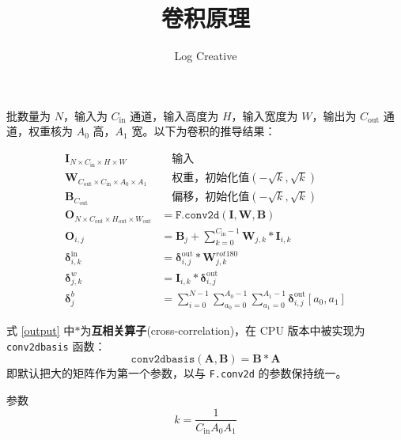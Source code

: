 \documentclass{ctexart}
\begin{document}
    \title{卷积原理}
    \author{Log Creative}
    \date{}
    \maketitle

    批数量为 $N$，输入为 $C_\text{in}$ 通道，输入高度为 $H$，输入宽度为 $W$，输出为 $C_\text{out}$ 通道，权重核为 $A_0$ 高，$A_1$ 宽。以下为卷积的推导结果\cite{gate}：

    \begin{align}
        \mathbf{I}_{N\times C_\text{in}\times H\times W}&\quad\text{输入}\nonumber\\
        \mathbf{W}_{C_\text{out}\times C_\text{in}\times A_0\times A_1}&\quad\text{权重，初始化值}(-\sqrt{k},\sqrt{k})\nonumber\\
        \mathbf{B}_{C_\text{out}}&\quad\text{偏移，初始化值}(-\sqrt{k},\sqrt{k})\nonumber\\
        \mathbf{O}_{N\times C_\text{out}\times H_\text{out}\times W_\text{out}}&=\texttt{F.conv2d}(\mathbf{I},\mathbf{W},\mathbf{B})\\
        \mathbf{O}_{i,j}&=\mathbf{B}_j+\sum_{k=0}^{C_\text{in}-1}\mathbf{W}_{j,k}*\mathbf{I}_{i,k}\label{output}\\
        \mathbf{\delta}^\text{in}_{i,k}&=\mathbf{\delta}^\text{out}_{i,j}*\mathbf{W}^{rot180}_{j,k}\label{deltain}\\
        \mathbf{\delta}^{w}_{j,k}&=\mathbf{I}_{i,k}*\mathbf{\delta}^\text{out}_{i,j}\label{deltaweight}\\
        \mathbf{\delta}^{b}_{j}&=\sum_{i=0}^{N-1}\sum_{a_0=0}^{A_0-1}\sum_{a_1=0}^{A_1-1}\mathbf{\delta}^\text{out}_{i,j}[a_0,a_1]\label{deltabia}
    \end{align}

    式 \eqref{output} 中$*$为\textbf{互相关算子}(cross-correlation)，在 CPU 版本中被实现为 \verb"conv2dbasis" 函数：
    \begin{equation}
        \texttt{conv2dbasis}(\mathbf{A},\mathbf{B}) = \mathbf{B}*\mathbf{A}
    \end{equation}
    即默认把大的矩阵作为第一个参数，以与 \verb"F.conv2d" 的参数保持统一。

    参数
    \begin{equation}
        k=\frac{1}{C_\text{in}A_0A_1}
    \end{equation}
    
\end{document}
